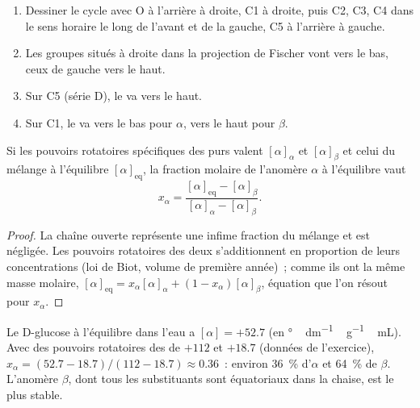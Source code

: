 \begin{method}\label{met:b2:biomolecules:haworth}
\begin{enumerate}
  \item Dessiner le cycle avec O à l'arrière à droite, C1 à droite, puis C2, C3, C4 dans le sens horaire
        le long de l'avant et de la gauche, C5 à l'arrière à gauche.
  \item Les groupes situés à droite dans la projection de Fischer vont vers le bas, ceux de gauche vers le haut.
  \item Sur C5 (série D), le  va vers le haut.
  \item Sur C1, le  va vers le bas pour $\alpha$, vers le haut pour $\beta$.
\end{enumerate}
\end{method}

\begin{proposition}\label{prop:b2:biomolecules:mutarotation}
Si les pouvoirs rotatoires spécifiques des  purs valent $[\alpha]_\alpha$ et $[\alpha]_\beta$ et
celui du mélange à l'équilibre $[\alpha]_{\mathrm{eq}}$, la fraction molaire de l'anomère $\alpha$ à
l'équilibre vaut
\begin{equation*}
x_\alpha = \frac{[\alpha]_{\mathrm{eq}} - [\alpha]_\beta}{[\alpha]_\alpha - [\alpha]_\beta}.
\end{equation*}
\end{proposition}

\begin{proof}
La chaîne ouverte représente une infime fraction du mélange et est négligée. Les pouvoirs rotatoires des
deux  s'additionnent en proportion de leurs concentrations (loi de Biot, volume de première
année)~; comme ils ont la même masse molaire, $[\alpha]_{\mathrm{eq}} = x_\alpha[\alpha]_\alpha + (1 - x_\alpha)[\alpha]_\beta$,
équation que l'on résout pour $x_\alpha$.
\end{proof}

Le D-glucose à l'équilibre dans l'eau a $[\alpha] = +52.7$ (en \unit{\degree\,dm^{-1}\,g^{-1}\,mL}).
Avec des pouvoirs rotatoires des  de $+112$ et $+18.7$ (données de l'exercice), $x_\alpha = (52.7 - 18.7)/(112 - 18.7)
\approx 0.36$~: environ 36~\% d'$\alpha$ et 64~\% de $\beta$. L'anomère $\beta$, dont tous les
substituants sont équatoriaux dans la chaise, est le plus stable.

